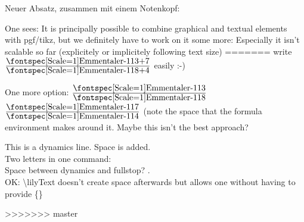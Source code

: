 \documentclass{scrartcl}
\newcommand*{\lilyTimeSignature}[2]{$\frac{\mbox{\lilyText{#1}}}{\mbox{\lilyText{#2}}}$}
\begin{document}
\normalsize
Neuer Absatz, zusammen mit einem Notenkopf: 

One sees: It is principally possible to combine graphical and textual elements with pgf/tikz,
but we definitely have to work on it some more: Especially it isn't scalable so far (explicitely or implicitely following text size)
=======
	write \lilyTimeSignature{3+7}{8+4} easily :-)
	
	One more option: \lilyTimeSignature{3}{8} \lilyText{+} \lilyTimeSignature{7}{4} (note the space that the formula environment makes around it. Maybe this isn't the best approach?

	This is a dynamics  line. Space is added.\\
	Two letters in one command: \\
	Space between dynamics and fullstop? .\\
	OK: \textbackslash lilyText doesn't create space afterwards but allows one without having to provide \{\}
	
>>>>>>> master
\end{document}
